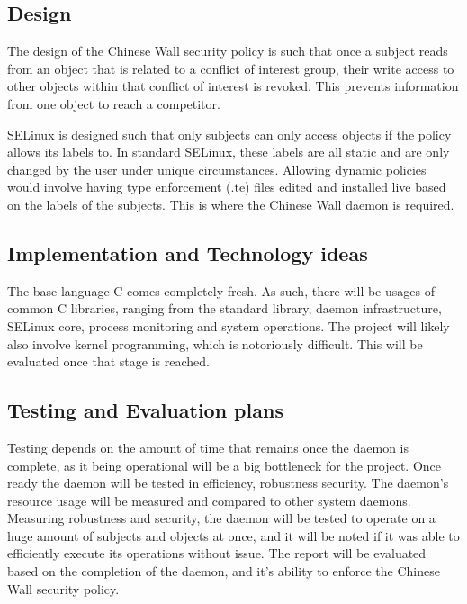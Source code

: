 \documentclass[11pt,titlepage,dvipsnames,table,xcdraw]{article}
\begin{document}
\subsection{Design}

The design of the Chinese Wall security policy is such that once a subject reads from an object that is related to a conflict of interest group, their write access to other objects within that conflict of interest
is revoked. This prevents information from one object to reach a competitor. 

SELinux is designed such that only subjects can only access objects if the policy allows its labels to. In standard SELinux, these labels are all static and are only changed by the user under unique circumstances.
Allowing dynamic policies would involve having type enforcement (.te) files edited and installed live based on the labels of the subjects. This is where the Chinese Wall daemon is required.

\subsection{Implementation and Technology ideas}

The base language C comes completely fresh. As such, there will be usages of common C libraries, ranging from the standard library, daemon infrastructure, SELinux core, process monitoring
and system operations. The project will likely also involve kernel programming, which is notoriously difficult. This will be evaluated once that stage is reached.

\subsection{Testing and Evaluation plans}

Testing depends on the amount of time that remains once the daemon is complete, as it being operational will be a big bottleneck for the project. Once ready the daemon will be tested in efficiency, robustness
security. The daemon's resource usage will be measured and compared to other system daemons. Measuring robustness and security, the daemon will be tested to operate on a huge amount of subjects and objects at once,
and it will be noted if it was able to efficiently execute its operations without issue. The report will be evaluated based on the completion of the daemon, and it's ability to enforce the Chinese Wall security
policy.


\clearpage
\end{document}
